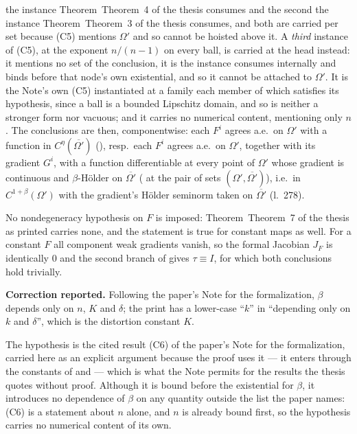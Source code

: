 \begin{theorem}[Theorem 7]
the instance Theorem~Theorem~4 of the thesis consumes and the second the instance
Theorem~Theorem~3 of the thesis consumes, and both are carried per set because (C5) mentions
$\Omega'$ and so cannot be hoisted above it.  A \emph{third} instance of (C5),
at the exponent $n/(n-1)$ on every ball, is carried at the head instead: it
mentions no set of the conclusion, it is the instance
 consumes internally and binds before that node's
own existential, and so it cannot be attached to $\Omega'$.  It is the Note's own
(C5) instantiated at a family each member of which satisfies its hypothesis,
since a ball is a bounded Lipschitz domain, and so is neither a stronger form nor
vacuous; and it carries no numerical content, mentioning only $n$.  The
conclusions are then, componentwise:
each $F^i$ agrees a.e.\ on $\Omega'$ with a function in
$C^\eta(\overline{\Omega'})$ (), resp.\ each $F^i$ agrees
a.e.\ on $\Omega'$, together with its gradient $G^i$, with a function
differentiable at every point of $\Omega'$ whose gradient is continuous and
$\beta$-H\"older on $\overline{\Omega'}$ ( at the pair of
sets $(\Omega',\overline{\Omega'})$), i.e.\ in $C^{1+\beta}(\Omega')$ with the
gradient's H\"older seminorm taken on $\overline{\Omega'}$ (l.~278).

No nondegeneracy hypothesis on $F$ is imposed: Theorem~Theorem~7 of the thesis as printed
carries none, and the statement is true for constant maps as well.  For a
constant $F$ all component weak gradients vanish, so the formal Jacobian $J_F$
is identically $0$ and the second branch of  gives
$\tau\equiv I$, for which both conclusions hold trivially.

\medskip
\noindent\textbf{Correction reported.}  Following the paper's Note for the
formalization, $\beta$ depends only on $n$, $K$ and $\delta$; the print has a
lower-case ``$k$'' in ``depending only on $k$ and $\delta$'', which is the
distortion constant $K$.

The hypothesis  is the cited result (C6) of the
paper's Note for the formalization, carried here as an explicit argument because
the proof uses it --- it enters through the constants of  and  --- which is what the
Note permits for the results the thesis quotes without proof.  Although it is
bound before the existential for $\beta$, it introduces no dependence of
$\beta$ on any quantity outside the list the paper names: (C6) is a statement
about $n$ alone, and $n$ is already bound first, so the hypothesis carries no
numerical content of its own.


\end{theorem}
